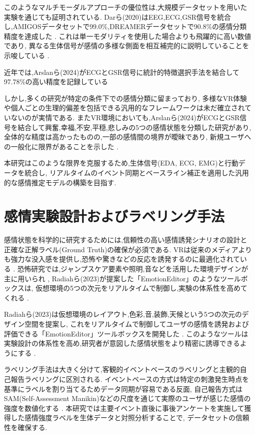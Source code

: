 \documentclass[book,paper=a4,fontsize=10pt,jafontscale=0.92]{jlreq}
\begin{document}
このようなマルチモーダルアプローチの優位性は,大規模データセットを用いた実験を通じても証明されている.
Darら(2020)はEEG,ECG,GSR信号を統合し,AMIGOSデータセットで99.0\%,DREAMERデータセットで90.8\%の感情分類精度を達成した \cite{Dar2020}.
これは単一モダリティを使用した場合よりも飛躍的に高い数値であり,
異なる生体信号が感情の多様な側面を相互補完的に説明していることを示唆している \cite{Dar2020}.

近年では,Arslanら(2024)がECGとGSR信号に統計的特徴選択手法を結合して97.78\%の高い精度を記録している \cite{Arslan2024}

しかし,多くの研究が特定の条件下での感情分類に留まっており,
多様なVR体験や個人ごとの生理的偏差を包括できる汎用的なフレームワークは未だ確立されていないのが実情である.
またVR環境においても,Arslanら(2024)がECGとGSR信号を結合して興奮,幸福,不安,平穏,悲しみの5つの感情状態を分類した研究があり,
全体的な精度は高かったものの,一部の感情間の境界が曖昧であり,
新規ユーザへの一般化に限界があることを示した \cite{Arslan2024}.

本研究はこのような限界を克服するため,生体信号(EDA, ECG, EMG)と行動データを統合し,
リアルタイムのイベント同期とベースライン補正を適用した汎用的な感情推定モデルの構築を目指す.

\section{感情実験設計およびラベリング手法}

感情状態を科学的に研究するためには,信頼性の高い感情誘発シナリオの設計と正確な正解ラベル(Ground Truth)の確保が必須である.
VRは従来のメディアよりも強力な没入感を提供し,恐怖や驚きなどの反応を誘発するのに最適化されている \cite{Liao2020DesignAE}.
恐怖研究では,ジャンプスケア要素や照明,音などを活用した環境デザインが主に用いられ \cite{Dozio2022},
Radiahら(2023)が提案した「EmotionEditor」のようなツールボックスは,
仮想環境の5つの次元をリアルタイムで制御し,実験の体系性を高めてくれる \cite{Radiah2023}.

Radiahら(2023)は仮想環境のレイアウト,色彩,音,装飾,天候という5つの次元のデザイン空間を提案し,
これをリアルタイムで制御してユーザの感情を誘発および評価できる「EmotionEditor」ツールボックスを開発した \cite{Radiah2023}.
このようなツールは実験設計の体系性を高め,研究者が意図した感情状態をより精密に誘導できるようにする \cite{Radiah2023}.

ラベリング手法は大きく分けて,客観的イベントベースのラベリングと主観的自己報告ラベリングに区別される.
イベントベースの方式は特定の刺激発生時点を基準にラベルを割り当てるためデータ同期が容易である反面,
自己報告方式はSAM(Self-Assessment Manikin)などの尺度を通じて実際のユーザが感じた感情の強度を数値化する \cite{MarinMorales2020, Liao2020DesignAE}.
本研究では主要イベント直後に事後アンケートを実施して獲得した感情強度ラベルを生体データと対照分析することで,
データセットの信頼性を確保する.
\end{document}
